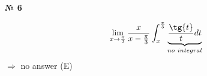 \documentclass{article}
\begin{document}
\textbf{№ 6} 

\begingroup

$$ \lim\limits_{x\to \frac{\pi}{3}} \frac{x}{x-\frac{\pi}{3}} \int_{x}^{\frac{\pi}{3}} \underbrace{\frac{\tg{t}}{t} dt}_{no \ integral} $$ $\Rightarrow{}$ no answer (E)

\endgroup
\end{document}
